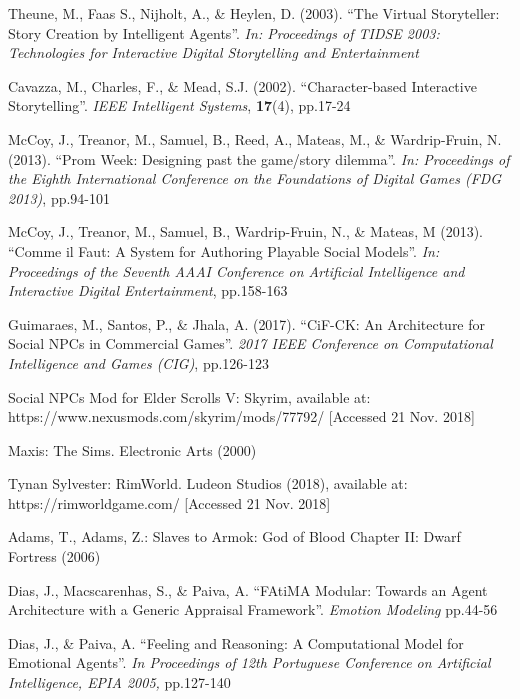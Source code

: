 \documentclass{sig-alternate-05-2015}
\begin{document}
\begin{thebibliography}{20}
Theune, M., Faas S., Nijholt, A., \& Heylen, D. (2003).
``The Virtual Storyteller: Story Creation by Intelligent Agents''.
\textit{In: Proceedings of TIDSE 2003: Technologies for Interactive Digital Storytelling and Entertainment}

Cavazza, M., Charles, F., \& Mead, S.J. (2002).
``Character-based Interactive Storytelling''.
\textit{IEEE Intelligent Systems}, \textbf{17}(4), pp.17-24

McCoy, J., Treanor, M., Samuel, B., Reed, A., Mateas, M., \& Wardrip-Fruin, N. (2013).
``Prom Week: Designing past the game/story dilemma''.
\textit{In: Proceedings of the Eighth International Conference on the Foundations of Digital Games (FDG 2013)}, pp.94-101

McCoy, J., Treanor, M., Samuel, B., Wardrip-Fruin, N., \& Mateas, M (2013).
``Comme il Faut: A System for Authoring Playable Social Models''.
\textit{In: Proceedings of the Seventh AAAI Conference on Artificial Intelligence and Interactive Digital Entertainment}, pp.158-163

Guimaraes, M., Santos, P., \& Jhala, A. (2017).
``CiF-CK: An Architecture for Social NPCs in Commercial Games''.
\textit{2017 IEEE Conference on Computational Intelligence and Games (CIG)}, pp.126-123

Social NPCs Mod for Elder Scrolls V: Skyrim, available at: https://www.nexusmods.com/skyrim/mods/77792/ [Accessed 21 Nov. 2018]

Maxis: The Sims. Electronic Arts (2000)

Tynan Sylvester: RimWorld. Ludeon Studios (2018), available at: https://rimworldgame.com/ [Accessed 21 Nov. 2018]

Adams, T., Adams, Z.: Slaves to Armok: God of Blood Chapter II: Dwarf Fortress (2006)

Dias, J., Macscarenhas, S., \& Paiva, A.
``FAtiMA Modular: Towards an Agent Architecture with
a Generic Appraisal Framework''.
\textit{Emotion Modeling} pp.44-56

Dias, J., \& Paiva, A.
``Feeling and Reasoning: A Computational Model for Emotional Agents''.
\textit{In Proceedings of 12th Portuguese Conference on Artificial Intelligence, EPIA 2005,} pp.127-140


\end{thebibliography}
 
\end{document}
